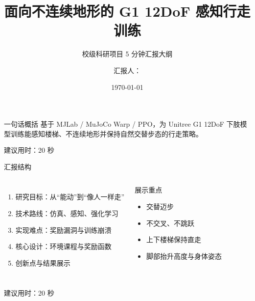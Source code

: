 \documentclass[aspectratio=169,11pt]{ctexbeamer}
\title{面向不连续地形的 G1 12DoF 感知行走训练}
\subtitle{校级科研项目 5 分钟汇报大纲}
\author{汇报人：\underline{\hspace{3cm}}}
\institute{单位：\underline{\hspace{4cm}}}
\date{\today}
\begin{document}
\begin{frame}
  \titlepage
  \vspace{-0.4em}
  \begin{block}{一句话概括}
    基于 MJLab / MuJoCo Warp / PPO，为 Unitree G1 12DoF 下肢模型训练能感知楼梯、不连续地形并保持自然交替步态的行走策略。
  \end{block}
  \vfill
  {\footnotesize 建议用时：20 秒}
\end{frame}

\begin{frame}{汇报结构}
  \begin{columns}[T,onlytextwidth]
    \begin{enumerate}
      \item 研究目标：从“能动”到“像人一样走”
      \item 技术路线：仿真、感知、强化学习
      \item 实现难点：奖励漏洞与训练崩溃
      \item 核心设计：环境课程与奖励函数
      \item 创新点与结果展示
    \end{enumerate}

    \begin{block}{展示重点}
      \begin{itemize}
        \item 交替迈步
        \item 不交叉、不跳跃
        \item 上下楼梯保持直走
        \item 脚部抬升高度与身体姿态
      \end{itemize}
    \end{block}
  \end{columns}
  \vfill
  {\footnotesize 建议用时：20 秒}
\end{frame}
\end{document}
